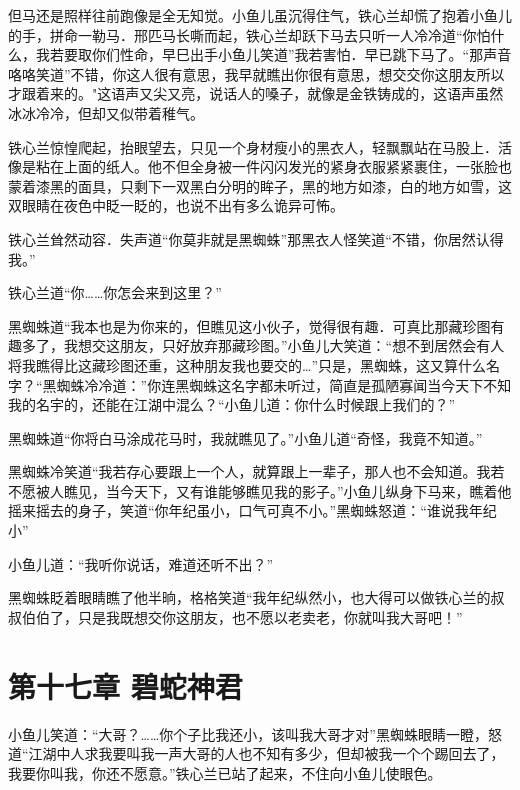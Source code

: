 \documentclass[12pt,oneside]{book}
\begin{document}
但马还是照样往前跑像是全无知觉。小鱼儿虽沉得住气，铁心兰却慌了抱着小鱼儿的手，拼命一勒马．邢匹马长嘶而起，铁心兰却跃下马去只听一人冷冷道``你怕什么，我若要取你们性命，早巳出手小鱼儿笑道''我若害怕．早已跳下马了。``那声音咯咯笑道''不错，你这人很有意思，我早就瞧出你很有意思，想交交你这朋友所以才跟着来的。"这语声又尖又亮，说话人的嗓子，就像是金铁铸成的，这语声虽然冰冰冷冷，但却又似带着稚气。

铁心兰惊惶爬起，抬眼望去，只见一个身材瘦小的黑衣人，轻飘飘站在马股上．活像是粘在上面的纸人。他不但全身被一件闪闪发光的紧身衣服紧紧裹住，一张脸也蒙着漆黑的面具，只剩下一双黑白分明的眸子，黑的地方如漆，白的地方如雪，这双眼睛在夜色中眨一眨的，也说不出有多么诡异可怖。

铁心兰耸然动容．失声道``你莫非就是黑蜘蛛''那黑衣人怪笑道``不错，你居然认得我。''

铁心兰道``你\ldots\ldots 你怎会来到这里？''

黑蜘蛛道``我本也是为你来的，但瞧见这小伙子，觉得很有趣．可真比那藏珍图有趣多了，我想交这朋友，只好放弃那藏珍图。''小鱼儿大笑道：``想不到居然会有人将我瞧得比这藏珍图还重，这种朋友我也要交的\ldots{}''只是，黑蜘蛛，这又算什么名字？``黑蜘蛛冷冷道：''你连黑蜘蛛这名字都未听过，简直是孤陋寡闻当今天下不知我的名宇的，还能在江湖中混么？``小鱼儿道：你什么时候跟上我们的？''

黑蜘蛛道``你将白马涂成花马时，我就瞧见了。''小鱼儿道``奇怪，我竟不知道。''

黑蜘蛛冷笑道``我若存心要跟上一个人，就算跟上一辈子，那人也不会知道。我若不愿被人瞧见，当今天下，又有谁能够瞧见我的影子。''小鱼儿纵身下马来，瞧着他摇来摇去的身子，笑道``你年纪虽小，口气可真不小。''黑蜘蛛怒道：``谁说我年纪小''

小鱼儿道：``我听你说话，难道还听不出？''

黑蜘蛛眨着眼睛瞧了他半晌，格格笑道``我年纪纵然小，也大得可以做铁心兰的叔叔伯伯了，只是我既想交你这朋友，也不愿以老卖老，你就叫我大哥吧！''

\hypertarget{ux7b2cux5341ux4e03ux7ae0-ux78a7ux86c7ux795eux541b}{%
\chapter{第十七章
碧蛇神君}\label{ux7b2cux5341ux4e03ux7ae0-ux78a7ux86c7ux795eux541b}}

小鱼儿笑道：``大哥？\ldots\ldots 你个子比我还小，该叫我大哥才对''黑蜘蛛眼睛一瞪，怒道``江湖中人求我要叫我一声大哥的人也不知有多少，但却被我一个个踢回去了，我要你叫我，你还不愿意。''铁心兰已站了起来，不住向小鱼儿使眼色。
\end{document}
